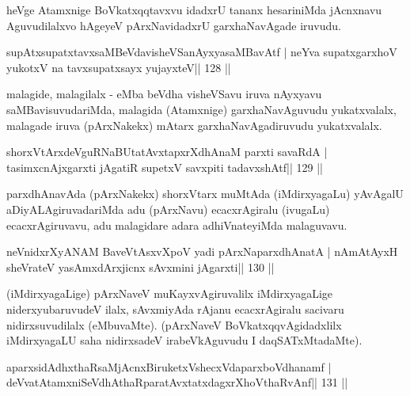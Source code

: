 \begin{artha}
heVge Atamxnige BoVkatxqqtavxvu idadxrU tananx hesariniMda jAcnxnavu 
Aguvudilalxvo hAgeyeV pArxNavidadxrU garxhaNavAgade iruvudu.
\end{artha} 

\begin{shl}
supAtxsupatxtavxsaMBeVdavisheVSanAyxyasaMBavAtf |
neYva supatxgarxhoV yukotxV na tavxsupatxsayx yujayxteV\hfill || 128 ||
\end{shl}

\begin{artha}
malagide, malagilalx - eMba beVdha visheVSavu iruva nAyxyavu saMBavisuvudariMda, malagida (Atamxnige) garxhaNavAguvudu yukatxvalalx, malagade iruva (pArxNakekx) mAtarx garxhaNavAgadiruvudu yukatxvalalx.
\end{artha}


\begin{shl}
shorxVtArxdeVguRNaBUtatAvxtapxrXdhAnaM parxti savaRdA |
tasimxcnAjxgarxti jAgatiR supetxV savxpiti tadavxshAtf\hfill || 129 ||
\end{shl}

\begin{artha}
parxdhAnavAda (pArxNakekx) shorxVtarx muMtAda (iMdirxyagaLu) yAvAgalU aDiyALAgiruvadariMda adu (pArxNavu) ecacxrAgiralu (ivugaLu) ecacxrAgiruvavu, adu malagidare adara adhiVnateyiMda malaguvavu.
\end{artha}

\begin{shl}
neVnidxrXyANAM BaveVtAsxvXpoV yadi pArxNaparxdhAnatA |
nAmAtAyxH sheVrateV yasAmxdArxjicnx sAvxmini jAgarxti\hfill || 130 ||
\end{shl}

\begin{artha}
(iMdirxyagaLige) pArxNaveV muKayxvAgiruvalilx iMdirxyagaLige niderxyu\break baruvudeV ilalx, sAvxmiyAda rAjanu ecacxrAgiralu sacivaru nidirxsuvudilalx (eMbuvaMte). (pArxNaveV BoVkatxqqvAgidadxlilx iMdirxyagaLU saha nidirxsadeV irabeVkAguvudu I daqSATxMtadaMte).
\end{artha}


\begin{shl}
aparxsidAdhxthaRsaMjAcnxBiruketxVshecxVdaparxboVdhanamf |
deVvatAtamxniSeVdhAthaRparatAvxtatxdagxrXhoV\s thaRvAnf\hfill || 131 ||
\end{shl}

